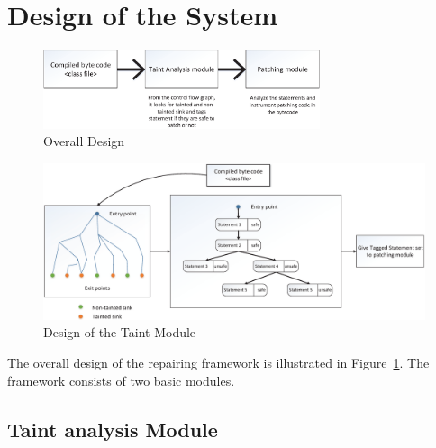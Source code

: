 \section{Design of the System}
\label{sec:SystemDesign}


\begin{figure}[!htb]
\centering
\includegraphics[width=3.2in]{images/OverallDesign.eps}
\caption{Overall Design}
\label{fig:overallDesign}
\end{figure}


% 

\begin{figure}
\centering
  \includegraphics[width= 7.0in]{images/TaintModule.eps}
  \caption{Design of the Taint Module}
  \label{fig:TaintModule}
\end{figure}


The overall design of the repairing framework is illustrated in
Figure~\ref{fig:overallDesign}. The framework consists of two basic modules.


\subsection{Taint analysis Module}
\label{subsec:TaintModule}

